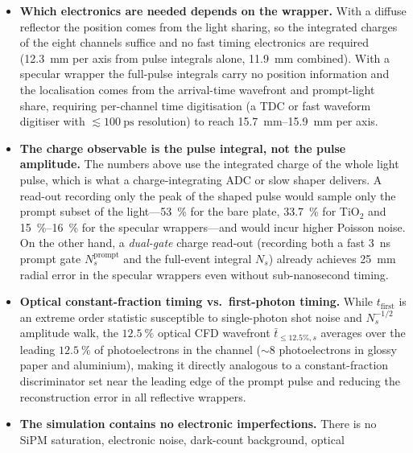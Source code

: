\documentclass[11pt,a4paper]{article}
\begin{document}
\begin{itemize}
  \item \textbf{Which electronics are needed depends on the wrapper.}  With a
        diffuse reflector the position comes from the light sharing, so the
        integrated charges of the eight channels suffice and no fast timing
        electronics are required (\SI{12.3}{\milli\meter} per axis from pulse
        integrals alone, \SI{11.9}{\milli\meter} combined).  With a specular
        wrapper the full-pulse integrals carry no position information and the
        localisation comes from the arrival-time wavefront and prompt-light
        share, requiring per-channel time digitisation (a TDC or fast waveform
        digitiser with $\lesssim\SI{100}{\ps}$ resolution) to reach
        \SI{15.7}{\milli\meter}--\SI{15.9}{\milli\meter} per axis.
  \item \textbf{The charge observable is the pulse integral, not the pulse
        amplitude.}  The numbers above use the integrated charge of the whole
        light pulse, which is what a charge-integrating ADC or slow shaper
        delivers.  A read-out recording only the peak of the shaped pulse would
        sample only the prompt subset of the light---\SI{53}{\percent} for the
        bare plate, \SI{33.7}{\percent} for TiO$_2$ and \SIrange{15}{16}{\percent}
        for the specular wrappers---and would incur higher Poisson noise.  On
        the other hand, a \emph{dual-gate} charge read-out (recording both a
        fast \SI{3}{\nano\second} prompt gate $N^{\mathrm{prompt}}_s$ and the
        full-event integral $N_s$) already achieves \SI{25}{\milli\meter}
        radial error in the specular wrappers even without sub-nanosecond
        timing.
  \item \textbf{Optical constant-fraction timing vs.\ first-photon timing.}
        While $t_{\mathrm{first}}$ is an extreme order statistic susceptible to
        single-photon shot noise and $N_s^{-1/2}$ amplitude walk, the
        $\SI{12.5}{\percent}$ optical CFD wavefront $\bar t_{\le 12.5\%,s}$
        averages over the leading $\SI{12.5}{\percent}$ of photoelectrons in the
        channel ($\sim 8$ photoelectrons in glossy paper and aluminium),
        making it directly analogous to a constant-fraction discriminator set
        near the leading edge of the prompt pulse and reducing the reconstruction
        error in all reflective wrappers.
  \item \textbf{The simulation contains no electronic imperfections.}  There is
        no SiPM saturation, electronic noise, dark-count background, optical

\end{itemize}
\end{document}
